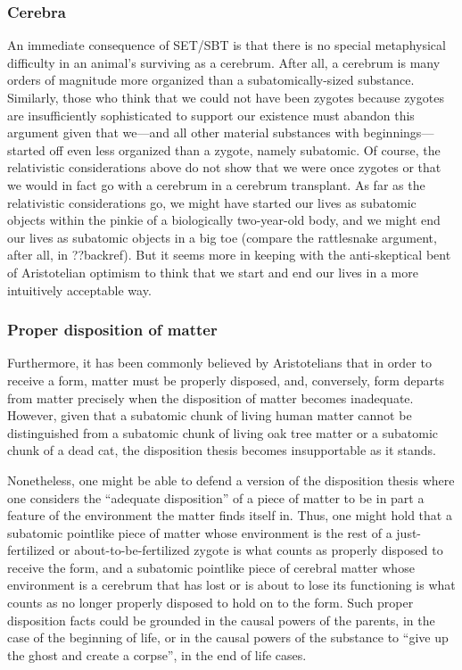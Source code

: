 \subsubsection{Cerebra}
An immediate consequence of SET/SBT is that there is no special metaphysical difficulty in an animal's 
surviving as a cerebrum. After all, a cerebrum is many orders of magnitude more organized than a subatomically-sized
substance. Similarly, those who think that we could not have been zygotes because zygotes are insufficiently sophisticated
to support our existence must abandon this argument given that we---and all other material substances with beginnings---started
off even less organized than a zygote, namely subatomic. Of course, the relativistic considerations above do not 
show that we were once zygotes or that we would in fact go with a cerebrum in a cerebrum transplant. As far as the relativistic 
considerations go, we might have started our lives as subatomic objects within the pinkie of a biologically two-year-old 
body, and we might end our lives as subatomic objects in a big toe (compare the rattlesnake argument, after all, in ??backref).
But it seems more in keeping with the anti-skeptical bent of Aristotelian optimism to think that we start and end our lives 
in a more intuitively acceptable way.

\subsubsection{Proper disposition of matter}\label{sec:disposition}
Furthermore, it has been commonly believed by Aristotelians that in order to receive a form, matter must be properly disposed, and,
conversely, form departs from matter precisely when the disposition of matter becomes inadequate. However, given that a subatomic chunk of living human matter cannot be distinguished from a subatomic chunk of living oak tree matter or a subatomic chunk of a dead cat, the disposition thesis becomes insupportable as it stands. 

Nonetheless, one might be able to defend a version of the disposition thesis where one considers the ``adequate disposition'' of 
a piece of matter to be in part a feature of the environment the matter finds itself in. Thus, one might hold that a subatomic
pointlike piece of matter whose environment is the rest of a just-fertilized or about-to-be-fertilized zygote is what counts as 
properly disposed to receive the form, and a subatomic pointlike piece of cerebral matter whose environment is a cerebrum that 
has lost or is about to lose its functioning is what counts as no longer properly disposed to hold on to the form. Such proper
disposition facts could be grounded in the causal powers of the parents, in the case of the beginning of life, or in the causal 
powers of the substance to ``give up the ghost and create a corpse'', in the end of life cases. 

